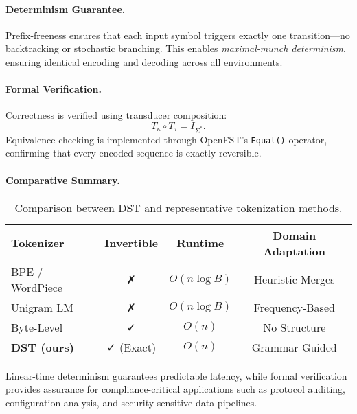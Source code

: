 \paragraph{Determinism Guarantee.}
Prefix-freeness ensures that each input symbol triggers exactly one transition—no backtracking or stochastic branching.
This enables \emph{maximal-munch determinism}, ensuring identical encoding and decoding across all environments.

\paragraph{Formal Verification.}
Correctness is verified using transducer composition:
\[
T_\kappa \circ T_\tau = I_{\Sigma^*}.
\]
Equivalence checking is implemented through OpenFST’s \texttt{Equal()} operator, confirming that every encoded sequence is exactly reversible.

\paragraph{Comparative Summary.}
\begin{table}[t]
\centering
\small
\begin{tabular}{lccc}
\toprule
\textbf{Tokenizer} & \textbf{Invertible} & \textbf{Runtime} & \textbf{Domain Adaptation} \\
\midrule
BPE / WordPiece & ✗ & $O(n\log B)$ & Heuristic Merges \\
Unigram LM & ✗ & $O(n\log B)$ & Frequency-Based \\
Byte-Level & ✓ & $O(n)$ & No Structure \\
\textbf{DST (ours)} & ✓ (Exact) & $O(n)$ & Grammar-Guided \\
\bottomrule
\end{tabular}
\caption{Comparison between DST and representative tokenization methods.}
\label{tab:tokenizer_comparison}
\end{table}

Linear-time determinism guarantees predictable latency, while formal verification provides assurance for compliance-critical applications such as protocol auditing, configuration analysis, and security-sensitive data pipelines.
